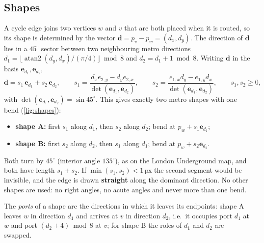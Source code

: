 \documentclass[11pt,a4paper]{article}
\newcommand{\dirv}[1]{\mathbf{e}_{#1}}
\begin{document}
\subsection{Shapes}
\label{sec:shapes}

A cycle edge joins two vertices $w$ and $v$ that are both placed when it is routed, so its shape is determined by the vector $\mathbf d=p_v-p_w=(d_x,d_y)$. The direction of $\mathbf d$ lies in a $45^\circ$ sector between two neighbouring metro directions $d_1=\lfloor \operatorname{atan2}(d_y,d_x)/(\pi/4)\rfloor \bmod 8$ and $d_2=d_1+1 \bmod 8$. Writing $\mathbf d$ in the basis $\dirv{d_1},\dirv{d_2}$,
\[
  \mathbf d = s_1\,\dirv{d_1} + s_2\,\dirv{d_2},\qquad
  s_1=\frac{d_x e_{2,y}-d_y e_{2,x}}{\det(\dirv{d_1},\dirv{d_2})},\qquad
  s_2=\frac{e_{1,x}d_y-e_{1,y}d_x}{\det(\dirv{d_1},\dirv{d_2})},\qquad s_1,s_2\ge 0,
\]
with $\det(\dirv{d_1},\dirv{d_2})=\sin45^\circ$. This gives exactly two metro shapes with one bend (\cref{fig:shapes}):
\begin{itemize}
  \item \textbf{shape A:} first $s_1$ along $d_1$, then $s_2$ along $d_2$; bend at $p_w+s_1\dirv{d_1}$;
  \item \textbf{shape B:} first $s_2$ along $d_2$, then $s_1$ along $d_1$; bend at $p_w+s_2\dirv{d_2}$.
\end{itemize}
Both turn by $45^\circ$ (interior angle $135^\circ$), as on the London Underground map, and both have length $s_1+s_2$. If $\min(s_1,s_2)<1$\,px the second segment would be invisible, and the edge is drawn \textbf{straight} along the dominant direction. No other shapes are used: no right angles, no acute angles and never more than one bend.

The \emph{ports} of a shape are the directions in which it leaves its endpoints: shape A leaves $w$ in direction $d_1$ and arrives at $v$ in direction $d_2$, i.e.\ it occupies port $d_1$ at $w$ and port $(d_2+4)\bmod 8$ at $v$; for shape B the roles of $d_1$ and $d_2$ are swapped.
\end{document}

